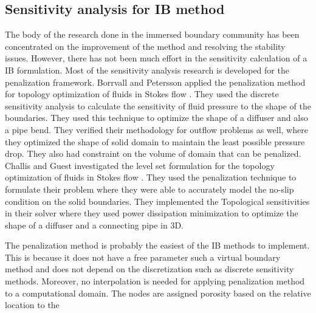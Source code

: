 \subsection{Sensitivity analysis for IB method}
The body of the research done in the immersed boundary community has been concentrated on the improvement of the method and resolving the stability issues. However, there has not been much effort in the sensitivity calculation of a IB formulation. Most of the sensitivity analysis research is developed for the penalization framework. Borrvall and Petersson applied the penalization method for topology optimization of fluids in Stokes flow \cite{borrvall2003topology}. They used the discrete sensitivity analysis to calculate the sensitivity of fluid pressure to the shape of the boundaries. They used this technique to optimize the shape of a diffuser and also a pipe bend. They verified their methodology for outflow problems as well, where they optimized the shape of solid domain to maintain the least possible pressure drop. They also had constraint on the volume of domain that can be penalized.  Challis and Guest investigated the level set formulation for the topology optimization of fluids in Stokes flow \cite{challis2009level}. They used the penalization technique to formulate their problem where they were able to accurately model the no-slip condition on the solid boundaries. They implemented the Topological sensitivities in their solver where they used power dissipation minimization to optimize the shape of a diffuser and a connecting pipe in 3D.

The penalization method is probably the easiest of the IB methods to implement. This is because it does not have a free parameter such a virtual boundary method and does not depend on the discretization such as discrete sensitivity methods. Moreover, no interpolation is needed for applying penalization method to a computational domain. The nodes are assigned porosity based on the relative location to the